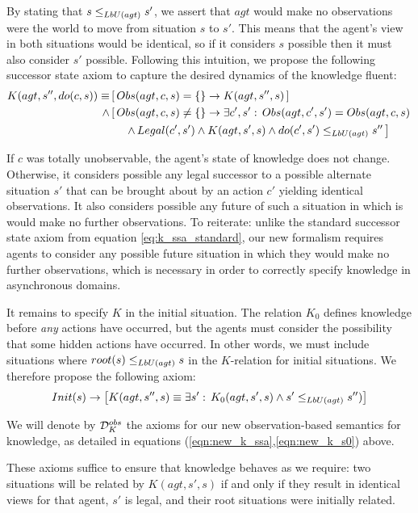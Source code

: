 By stating that $s\leq_{LbU(agt)}s'$, we assert that $agt$ would
make no observations were the world to move from situation $s$ to
$s'$. This means that the agent's view in both situations would be
identical, so if it considers $s$ possible then it must also consider
$s'$ possible. Following this intuition, we propose the following
successor state axiom to capture the desired dynamics of the knowledge
fluent:\begin{align}
K(agt,s'',do(c,s))\equiv & \left[\, Obs(agt,c,s)=\{\}\rightarrow K(agt,s'',s)\,\right]\nonumber \\
\wedge & \left[\, Obs(agt,c,s)\neq\{\}\rightarrow\exists c',s':\, Obs(agt,c',s')=Obs(agt,c,s)\right.\nonumber \\
 & \left.\,\,\,\,\,\,\,\,\wedge\, Legal(c',s')\wedge K(agt,s',s)\wedge do(c',s')\leq_{LbU(agt)}s''\,\right]\label{eqn:new_k_ssa}\end{align}


If $c$ was totally unobservable, the agent's state of knowledge does
not change. Otherwise, it considers possible any legal successor to
a possible alternate situation $s'$ that can be brought about by
an action $c'$ yielding identical observations. It also considers
possible any future of such a situation in which is would make no
further observations. To reiterate: unlike the standard successor
state axiom from equation \eqref{eq:k_ssa_standard}, our new formalism
requires agents to consider any possible future situation in which
they would make no further observations, which is necessary in order
to correctly specify knowledge in asynchronous domains.

It remains to specify $K$ in the initial situation. The relation
$K_{0}$ defines knowledge before \emph{any} actions have occurred,
but the agents must consider the possibility that some hidden actions
have occurred. In other words, we must include situations where $root(s)\leq_{LbU(agt)}s$
in the $K$-relation for initial situations. We therefore propose
the following axiom:\begin{gather}
Init(s)\rightarrow\left[K(agt,s'',s)\equiv\exists s':\, K_{0}(agt,s',s)\wedge s'\leq_{LbU(agt)}s'')\right]\label{eqn:new_k_s0}\end{gather}


\begin{defn}
We will denote by $\mathcal{D}_{K}^{obs}$ the axioms for our new observation-based
semantics for knowledge, as detailed in equations (\ref{eqn:new_k_ssa},\ref{eqn:new_k_s0})
above. 
\end{defn}
These axioms suffice to ensure that knowledge behaves as we require:
two situations will be related by $K(agt,s',s)$ if and only if they
result in identical views for that agent, $s'$ is legal, and their
root situations were initially related.

